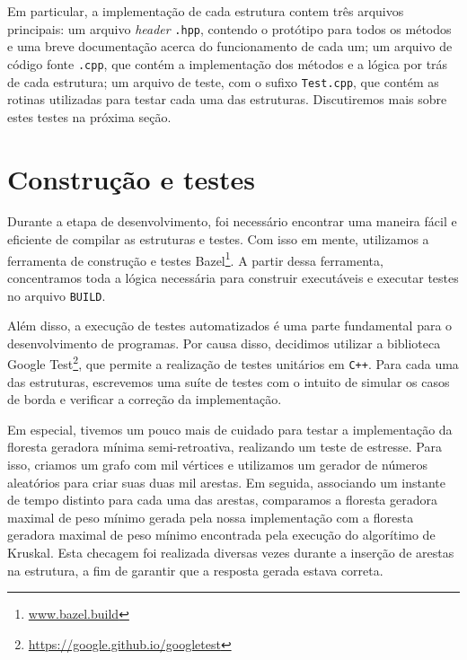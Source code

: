 Em particular, a implementação de cada estrutura contem três arquivos principais: um arquivo \emph{header} \texttt{.hpp}, contendo o protótipo para todos os métodos e uma breve documentação acerca do funcionamento de cada um; um arquivo de código fonte \texttt{.cpp}, que contém a implementação dos métodos e a lógica por trás de cada estrutura; um arquivo de teste, com o sufixo \texttt{Test.cpp}, que contém as rotinas utilizadas para testar cada uma das estruturas. Discutiremos mais sobre estes testes na próxima seção.

\section{Construção e testes}

Durante a etapa de desenvolvimento, foi necessário encontrar uma maneira fácil e eficiente de compilar as estruturas e testes. Com isso em mente, utilizamos a ferramenta de construção e testes Bazel\footnote{\url{www.bazel.build}}. A partir dessa ferramenta, concentramos toda a lógica necessária para construir executáveis e executar testes no arquivo \texttt{BUILD}.

Além disso, a execução de testes automatizados é uma parte fundamental para o desenvolvimento de programas. Por causa disso, decidimos utilizar a biblioteca Google Test\footnote{\url{https://google.github.io/googletest}}, que permite a realização de testes unitários em \texttt{C++}. Para cada uma das estruturas, escrevemos uma suíte de testes com o intuito de simular os casos de borda e verificar a correção da implementação.

Em especial, tivemos um pouco mais de cuidado para testar a implementação da floresta geradora mínima semi-retroativa, realizando um teste de estresse. Para isso, criamos um grafo com mil vértices e utilizamos um gerador de números aleatórios para criar suas duas mil arestas. Em seguida, associando um instante de tempo distinto para cada uma das arestas, comparamos a floresta geradora maximal de peso mínimo gerada pela nossa implementação com a floresta geradora maximal de peso mínimo encontrada pela execução do algorítimo de Kruskal. Esta checagem foi realizada diversas vezes durante a inserção de arestas na estrutura, a fim de garantir que a resposta gerada estava correta.

